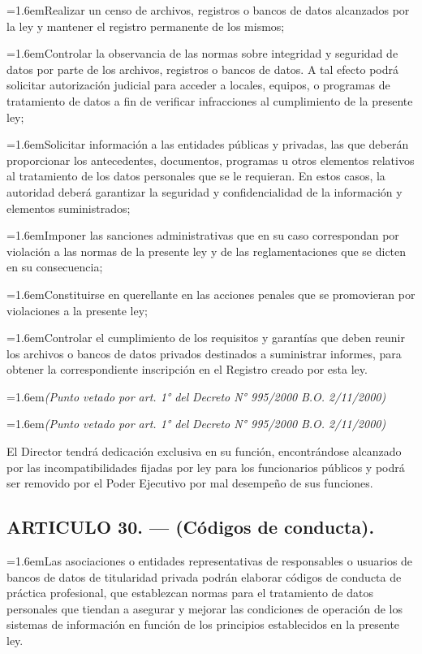 \documentclass[10pt,a4paper]{article}
\newcommand{\articulo}[1]{\subsection{#1}}
\newcommand{\inciso}[2]{\par{\hangindent=1.6em\hangafter=1\makebox[1.6em][l]{#1}#2\par}}
\begin{document}
\inciso{c)}{Realizar un censo de archivos, registros o bancos de datos alcanzados por la ley y mantener el registro permanente de los mismos;}

\inciso{d)}{Controlar la observancia de las normas sobre integridad y seguridad de datos por parte de los archivos, registros o bancos de datos. A tal efecto podrá solicitar autorización judicial para acceder a locales, equipos, o programas de tratamiento de datos a fin de verificar infracciones al cumplimiento de la presente ley;}

\inciso{e)}{Solicitar información a las entidades públicas y privadas, las que deberán proporcionar los antecedentes, documentos, programas u otros elementos relativos al tratamiento de los datos personales que se le requieran. En estos casos, la autoridad deberá garantizar la seguridad y confidencialidad de la información y elementos suministrados;}

\inciso{f)}{Imponer las sanciones administrativas que en su caso correspondan por violación a las normas de la presente ley y de las reglamentaciones que se dicten en su consecuencia;}

\inciso{g)}{Constituirse en querellante en las acciones penales que se promovieran por violaciones a la presente ley;}

\inciso{h)}{Controlar el cumplimiento de los requisitos y garantías que deben reunir los archivos o bancos de datos privados destinados a suministrar informes, para obtener la correspondiente inscripción en el Registro creado por esta ley.}

\inciso{2.}{\textit{(Punto vetado por art. 1° del }\textit{Decreto N° 995/2000}\textit{ B.O. 2/11/2000)}}

\inciso{3.}{\textit{(Punto vetado por art. 1° del }\textit{Decreto N° 995/2000}\textit{ B.O. 2/11/2000)}}

El Director tendrá dedicación exclusiva en su función, encontrándose alcanzado por las incompatibilidades fijadas por ley para los funcionarios públicos y podrá ser removido por el Poder Ejecutivo por mal desempeño de sus funciones.

\articulo{ARTICULO 30. — (Códigos de conducta).}
\inciso{1.}{Las asociaciones o entidades representativas de responsables o usuarios de bancos de datos de titularidad privada podrán elaborar códigos de conducta de práctica profesional, que establezcan normas para el tratamiento de datos personales que tiendan a asegurar y mejorar las condiciones de operación de los sistemas de información en función de los principios establecidos en la presente ley.}
\end{document}
